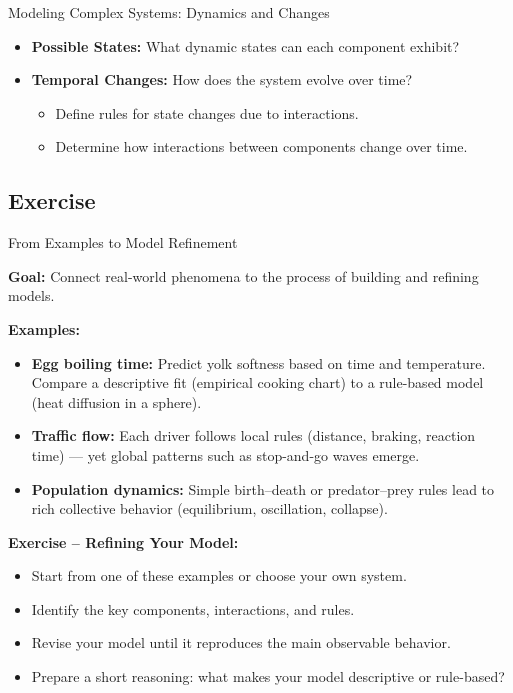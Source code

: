 \documentclass{beamer}
\begin{document}
\begin{frame}{Modeling Complex Systems: Dynamics and Changes}
    \begin{itemize}
        \item \textbf{Possible States:} What dynamic states can each component exhibit?
        \item \textbf{Temporal Changes:} How does the system evolve over time?
        \begin{itemize}
            \item Define rules for state changes due to interactions.
            \item Determine how interactions between components change over time.
        \end{itemize}
    \end{itemize}
\end{frame}

\subsection{Exercise}
\begin{frame}{From Examples to Model Refinement}

\textbf{Goal:} Connect real-world phenomena to the process of building and refining models.

\medskip
\textbf{Examples:}
\begin{itemize}
    \item \textbf{Egg boiling time:}  
          Predict yolk softness based on time and temperature.  
          Compare a descriptive fit (empirical cooking chart) to a rule-based model (heat diffusion in a sphere).

    \item \textbf{Traffic flow:}  
          Each driver follows local rules (distance, braking, reaction time) —  
          yet global patterns such as stop-and-go waves emerge.

    \item \textbf{Population dynamics:}  
          Simple birth–death or predator–prey rules lead to rich collective behavior
          (equilibrium, oscillation, collapse).
\end{itemize}

\medskip
\textbf{Exercise – Refining Your Model:}
\begin{itemize}
    \item Start from one of these examples or choose your own system.  
    \item Identify the key components, interactions, and rules.  
    \item Revise your model until it reproduces the main observable behavior.  
    \item Prepare a short reasoning: what makes your model descriptive or rule-based?
\end{itemize}

\end{frame}
\end{document}
